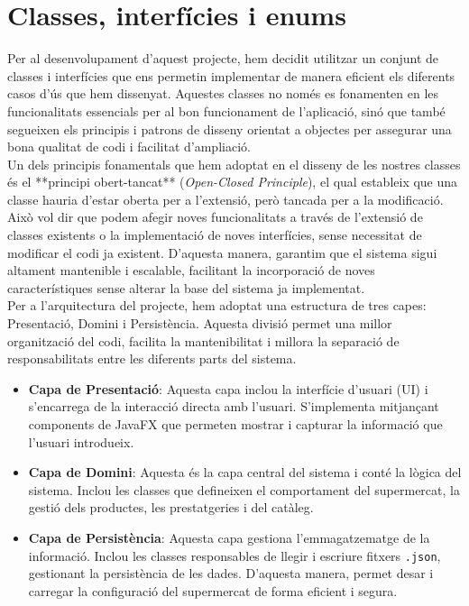 \documentclass[a4paper,12pt]{report}
\begin{document}
\section{Classes, interfícies i enums}

Per al desenvolupament d'aquest projecte, hem decidit utilitzar un conjunt de classes i interfícies que ens permetin implementar de manera eficient els diferents casos d'ús que hem dissenyat. Aquestes classes no només es fonamenten en les funcionalitats essencials per al bon funcionament de l'aplicació, sinó que també segueixen els principis i patrons de disseny orientat a objectes per assegurar una bona qualitat de codi i facilitat d'ampliació. \\

Un dels principis fonamentals que hem adoptat en el disseny de les nostres classes és el **principi obert-tancat** (\textit{Open-Closed Principle}), el qual estableix que una classe hauria d'estar oberta per a l'extensió, però tancada per a la modificació. Això vol dir que podem afegir noves funcionalitats a través de l'extensió de classes existents o la implementació de noves interfícies, sense necessitat de modificar el codi ja existent. D'aquesta manera, garantim que el sistema sigui altament mantenible i escalable, facilitant la incorporació de noves característiques sense alterar la base del sistema ja implementat.\\

Per a l’arquitectura del projecte, hem adoptat una estructura de tres capes: Presentació, Domini i Persistència. Aquesta divisió permet una millor organització del codi, facilita la mantenibilitat i millora la separació de responsabilitats entre les diferents parts del sistema.

\begin{itemize}
	\item \textbf{Capa de Presentació}: Aquesta capa inclou la interfície d’usuari (UI) i s’encarrega de la interacció directa amb l’usuari. S’implementa mitjançant components de JavaFX que permeten mostrar i capturar la informació que l’usuari introdueix.
	
	\item \textbf{Capa de Domini}: Aquesta és la capa central del sistema i conté la lògica del sistema. Inclou les classes que defineixen el comportament del supermercat, la gestió dels productes, les prestatgeries i del catàleg.
	
	\item \textbf{Capa de Persistència}: Aquesta capa gestiona l’emmagatzematge de la informació. Inclou les classes responsables de llegir i escriure fitxers \texttt{.json}, gestionant la persistència de les dades. D’aquesta manera, permet desar i carregar la configuració del supermercat de forma eficient i segura.
\end{itemize}
\end{document}
